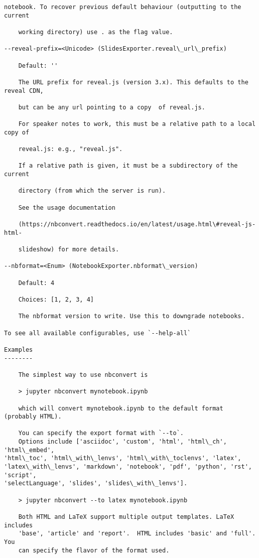 \documentclass[11pt]{article}
\begin{document}
\begin{Verbatim}[commandchars=\\\{\}]
    notebook. To recover previous default behaviour (outputting to the current

    working directory) use . as the flag value.

--reveal-prefix=<Unicode> (SlidesExporter.reveal\_url\_prefix)

    Default: ''

    The URL prefix for reveal.js (version 3.x). This defaults to the reveal CDN,

    but can be any url pointing to a copy  of reveal.js.

    For speaker notes to work, this must be a relative path to a local  copy of

    reveal.js: e.g., "reveal.js".

    If a relative path is given, it must be a subdirectory of the current

    directory (from which the server is run).

    See the usage documentation

    (https://nbconvert.readthedocs.io/en/latest/usage.html\#reveal-js-html-

    slideshow) for more details.

--nbformat=<Enum> (NotebookExporter.nbformat\_version)

    Default: 4

    Choices: [1, 2, 3, 4]

    The nbformat version to write. Use this to downgrade notebooks.

To see all available configurables, use `--help-all`

Examples
--------

    The simplest way to use nbconvert is

    > jupyter nbconvert mynotebook.ipynb

    which will convert mynotebook.ipynb to the default format (probably HTML).

    You can specify the export format with `--to`.
    Options include ['asciidoc', 'custom', 'html', 'html\_ch', 'html\_embed',
'html\_toc', 'html\_with\_lenvs', 'html\_with\_toclenvs', 'latex',
'latex\_with\_lenvs', 'markdown', 'notebook', 'pdf', 'python', 'rst', 'script',
'selectLanguage', 'slides', 'slides\_with\_lenvs'].

    > jupyter nbconvert --to latex mynotebook.ipynb

    Both HTML and LaTeX support multiple output templates. LaTeX includes
    'base', 'article' and 'report'.  HTML includes 'basic' and 'full'. You
    can specify the flavor of the format used.


\end{Verbatim}
\end{document}
